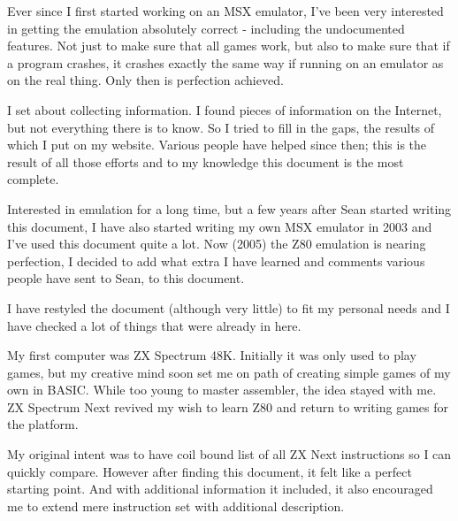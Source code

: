 \documentclass[12pt,twoside,openright,a4paper]{book}
\begin{document}
\begin{description}[style=unboxed,leftmargin=0cm]

	\item[Sean]\hfill
	
	Ever since I first started working on an MSX emulator, I've been very interested in getting the emulation absolutely correct - including the undocumented features. Not just to make sure that all games work, but also to make sure that if a program crashes, it crashes exactly the same way if running on an emulator as on the real thing. Only then is perfection achieved.

	I set about collecting information. I found pieces of information on the Internet, but not everything there is to know. So I tried to fill in the gaps, the results of which I put on my website. Various people have helped since then; this is the result of all those efforts and to my knowledge this document is the most complete.

	\item[Jan]\hfill

	Interested in emulation for a long time, but a few years after Sean started writing this document, I have also started writing my own MSX emulator in 2003 and I've used this document quite a lot. Now (2005) the Z80 emulation is nearing perfection, I decided to add what extra I have learned and comments various people have sent to Sean, to this document.

	I have restyled the document (although very little) to fit my personal needs and I have checked a lot of things that were already in here.

	\item[Tomaz]\hfill
	
	My first computer was ZX Spectrum 48K. Initially it was only used to play games, but my creative mind soon set me on path of creating simple games of my own in BASIC. While too young to master assembler, the idea stayed with me. ZX Spectrum Next revived my wish to learn Z80 and return to writing games for the platform.
	
	My original intent was to have coil bound list of all ZX Next instructions so I can quickly compare. However after finding this document, it felt like a perfect starting point. And with additional information it included, it also encouraged me to extend mere instruction set with additional description.
 
\end{description}
\end{document}
